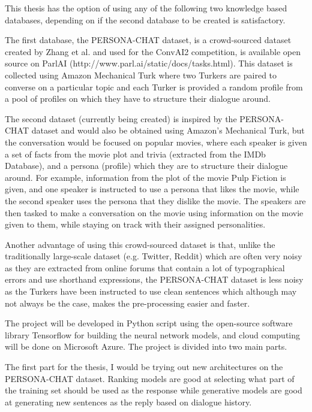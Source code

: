 \documentclass{article}
\begin{document}
	This thesis has the option of using any of the following two knowledge based databases, depending on if the second database to be created is satisfactory.
	
	The first database, the PERSONA-CHAT dataset, is a crowd-sourced dataset created by Zhang et al. \cite{zhang2018personalizing} and used for the ConvAI2 competition, is available open source on ParlAI (http://www.parl.ai/static/docs/tasks.html). This dataset is collected using Amazon Mechanical Turk where two Turkers are paired to converse on a particular topic and each Turker is provided a random profile from a pool of profiles on which they have to structure their dialogue around.
	
	The second dataset (currently being created) is inspired by the PERSONA-CHAT dataset and would also be obtained using Amazon's Mechanical Turk, but the conversation would be focused on popular movies, where each speaker is given a set of facts from the 	movie plot and trivia (extracted from the IMDb Database), and a persona (profile) which they are to structure their dialogue around. For example, information from the plot of the movie Pulp Fiction is given, and one speaker is instructed	to use a persona that likes the movie, while the second speaker uses the persona that they dislike the movie. The speakers are then tasked to make a conversation on the movie using information on the movie given to them, while staying on track with their assigned personalities.
	
	Another advantage of using this crowd-sourced dataset is that, unlike the traditionally large-scale dataset (e.g. Twitter, Reddit) which are often very noisy as they are extracted from online forums that contain a lot of typographical errors and use shorthand expressions, the PERSONA-CHAT dataset is less noisy as the Turkers have been instructed to use clean sentences which although may not always be the case, makes the pre-processing easier and faster.
	
	The project will be developed in Python script using the open-source software library Tensorflow for building the neural network	models, and cloud computing will be done on Microsoft Azure. The project is divided into two main parts. 
	
	The first part for the thesis, I would be trying out new architectures on the PERSONA-CHAT dataset.
	Ranking models are good at selecting what part of the training set should be used as the response while generative models are good at generating new sentences as the reply based on dialogue history.
	
\end{document}

